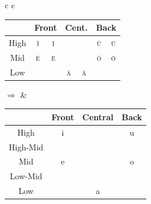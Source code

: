 \documentclass{report}[12pt]
\begin{document}
\begin{tcolorbox}
  \begin{tabular}{c c}
    \begin{tabular}{|c|c|c|c|c|c|c|}
      \hline
      & \multicolumn{2}{c|}{Front} & \multicolumn{2}{c|}{Cent.} & \multicolumn{2}{c|}{Back} \\
      \hline
      High & \cellcolor{gray} \textsc{\u{i}} & \textsc{\={i}} & & & \cellcolor{gray} \textsc{\u{u}} & \textsc{\={u}} \\
      \hline
      Mid & \cellcolor{gray} \textsc{\u{e}} & \textsc{\={e}} & & & \cellcolor{gray} \textsc{\u{o}} & \textsc{\={o}} \\
      \hline
      Low &  &  & \cellcolor{gray} \textsc{\u{a}} & \textsc{\={a}} & & \\
      \hline
    \end{tabular}
    \quad $\Rightarrow$ & 
                          \begin{tabular}{|c|c|c|c|}
                            \hline
                            & Front & Central & Back \\
                            \hline
                            High & i & & u \\
                            \hline
                            High-Mid & \cellcolor{magenta} \textipa{I} & & \cellcolor{magenta} \textipa{U} \\
                            \hline
                            Mid & e & & o \\
                            \hline
                            Low-Mid & \cellcolor{magenta} \textipa{E} & & \cellcolor{magenta} \textipa{O} \\
                            \hline
                            Low & & a & \\
                            \hline
                          \end{tabular}
  \end{tabular}
\end{tcolorbox}
\end{document}
